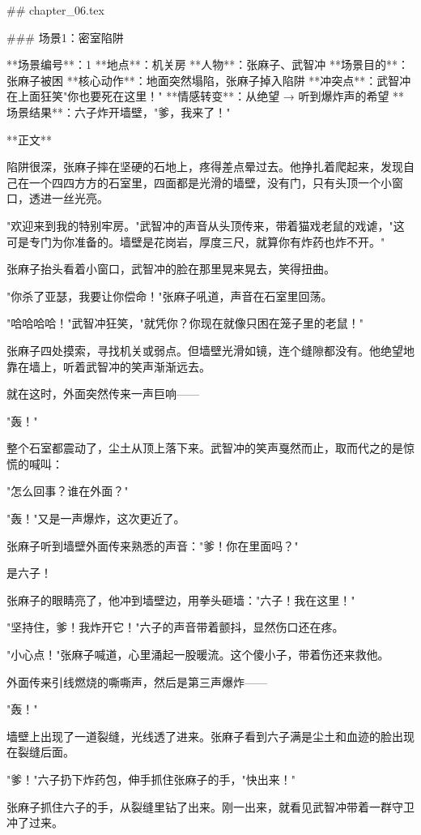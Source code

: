 ## chapter_06.tex

### 场景1：密室陷阱

**场景编号**：1  
**地点**：机关房  
**人物**：张麻子、武智冲  
**场景目的**：张麻子被困  
**核心动作**：地面突然塌陷，张麻子掉入陷阱  
**冲突点**：武智冲在上面狂笑"你也要死在这里！"  
**情感转变**：从绝望 → 听到爆炸声的希望  
**场景结果**：六子炸开墙壁，"爹，我来了！"

**正文**

陷阱很深，张麻子摔在坚硬的石地上，疼得差点晕过去。他挣扎着爬起来，发现自己在一个四四方方的石室里，四面都是光滑的墙壁，没有门，只有头顶一个小窗口，透进一丝光亮。

"欢迎来到我的特别牢房。"武智冲的声音从头顶传来，带着猫戏老鼠的戏谑，"这可是专门为你准备的。墙壁是花岗岩，厚度三尺，就算你有炸药也炸不开。"

张麻子抬头看着小窗口，武智冲的脸在那里晃来晃去，笑得扭曲。

"你杀了亚瑟，我要让你偿命！"张麻子吼道，声音在石室里回荡。

"哈哈哈哈！"武智冲狂笑，"就凭你？你现在就像只困在笼子里的老鼠！"

张麻子四处摸索，寻找机关或弱点。但墙壁光滑如镜，连个缝隙都没有。他绝望地靠在墙上，听着武智冲的笑声渐渐远去。

就在这时，外面突然传来一声巨响——

"轰！"

整个石室都震动了，尘土从顶上落下来。武智冲的笑声戛然而止，取而代之的是惊慌的喊叫：

"怎么回事？谁在外面？"

"轰！"又是一声爆炸，这次更近了。

张麻子听到墙壁外面传来熟悉的声音："爹！你在里面吗？"

是六子！

张麻子的眼睛亮了，他冲到墙壁边，用拳头砸墙："六子！我在这里！"

"坚持住，爹！我炸开它！"六子的声音带着颤抖，显然伤口还在疼。

"小心点！"张麻子喊道，心里涌起一股暖流。这个傻小子，带着伤还来救他。

外面传来引线燃烧的嘶嘶声，然后是第三声爆炸——

"轰！"

墙壁上出现了一道裂缝，光线透了进来。张麻子看到六子满是尘土和血迹的脸出现在裂缝后面。

"爹！"六子扔下炸药包，伸手抓住张麻子的手，"快出来！"

张麻子抓住六子的手，从裂缝里钻了出来。刚一出来，就看见武智冲带着一群守卫冲了过来。

